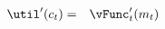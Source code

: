   \begin{eqnarray}
    \util^{\prime}({c}_{t}) & = & \null{\vFunc}^{\prime}_{t}({m}_{t})\label{eq:Envelope}
  \end{eqnarray}
